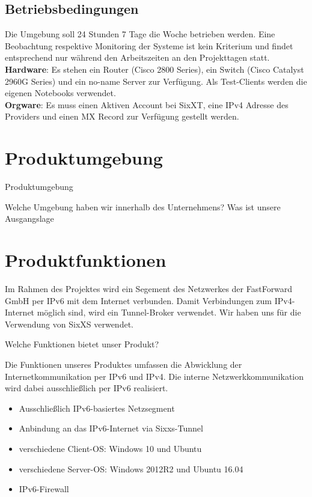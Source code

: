 \subsection{Betriebsbedingungen}

Die Umgebung soll 24 Stunden 7 Tage die Woche betrieben werden. Eine Beobachtung respektive Monitoring der Systeme ist kein Kriterium und findet entsprechend nur während den Arbeitszeiten an den Projekttagen statt.\\

{\bf Hardware}: Es stehen ein Router (Cisco 2800 Series), ein Switch (Cisco Catalyst 2960G Series) und ein no-name Server zur Verfügung. Als Test-Clients werden die eigenen Notebooks verwendet.\\
{\bf Orgware}: Es muss einen Aktiven Account bei SixXT, eine IPv4 Adresse des Providers und einen MX Record zur Verfügung gestellt werden.
\section{Produktumgebung}

Produktumgebung

Welche Umgebung haben wir innerhalb des Unternehmens? Was ist unsere Ausgangslage\section{Produktfunktionen}

Im Rahmen des Projektes wird ein Segement des Netzwerkes der FastForward GmbH per IPv6 mit dem Internet verbunden. Damit Verbindungen zum IPv4-Internet möglich sind, wird ein Tunnel-Broker verwendet. Wir haben uns für die Verwendung von SixXS verwendet. 

Welche Funktionen bietet unser Produkt?

Die Funktionen unseres Produktes umfassen die Abwicklung der Internetkommunikation per IPv6 und IPv4. Die interne Netzwerkkommunikation wird dabei ausschließlich per IPv6 realisiert.

\begin{itemize}
	\item Ausschließlich IPv6-basiertes Netzsegment
	\item Anbindung an das IPv6-Internet via Sixxs-Tunnel
	\item verschiedene Client-OS: Windows 10 und Ubuntu
	\item verschiedene Server-OS: Windows 2012R2 und Ubuntu 16.04
	\item IPv6-Firewall
\end{itemize}

